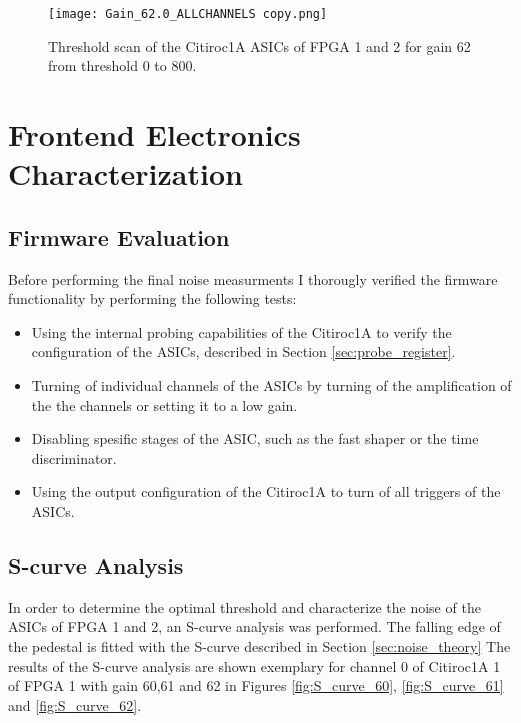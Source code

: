     \begin{figure}[H]
        \centering
        \texttt{[image: Gain\_62.0\_ALLCHANNELS copy.png]}
        \caption{Threshold scan of the Citiroc1A ASICs of FPGA 1 and 2 for gain 62 from threshold 0 to 800.}
        \label{fig:threshold_scan_62}
    \end{figure}
    \section{Frontend Electronics Characterization}
    \subsection{Firmware Evaluation}
    Before performing the final noise measurments I thorougly verified the firmware functionality by performing the following tests:
    \begin{itemize}
        \item Using the internal probing capabilities of the Citiroc1A to verify the configuration of the ASICs, described in Section \ref{sec:probe_register}.
        \item Turning of individual channels of the ASICs by turning of the amplification of the the channels or setting it to a low gain.
        \item Disabling spesific stages of the ASIC, such as the fast shaper or the time discriminator.
        \item Using the output configuration of the Citiroc1A to turn of all triggers of the ASICs.
    \end{itemize}
    \subsection{S-curve Analysis}
    In order to determine the optimal threshold and characterize the noise of the ASICs of FPGA 1 and 2, an S-curve analysis was performed.
    \newline
    The falling edge of the pedestal is fitted with the S-curve described in Section \ref{sec:noise_theory}
    \newline
    The results of the S-curve analysis are shown exemplary for channel 0 of Citiroc1A 1 of FPGA 1 with gain 60,61 and 62 in Figures \ref{fig:S_curve_60}, \ref{fig:S_curve_61} and \ref{fig:S_curve_62}.
    
